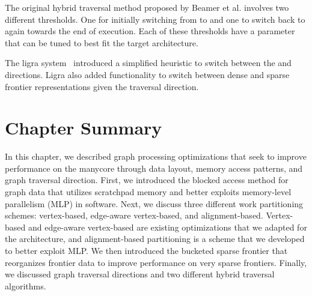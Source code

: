 The original hybrid traversal method proposed by Beamer et al. involves two different thresholds. One for initially switching from \push to \pull and one to switch back to \push again towards the end of execution.
Each of these thresholds have a parameter that can be tuned to best fit the target architecture. 

The ligra system~\cite{shun2013ligra} introduced a simplified heuristic to switch between the \push and \pull directions. 
Ligra also added functionality to switch between dense and sparse frontier representations given the traversal direction.


\section{Chapter Summary}

In this chapter, we described graph processing optimizations that seek to improve performance on the \hb manycore through data layout, memory access patterns, and graph traversal direction.
First, we introduced the blocked access method for graph data that utilizes scratchpad memory and better exploits memory-level parallelism (MLP) in software.
Next, we discuss three different work partitioning schemes: vertex-based, edge-aware vertex-based, and alignment-based.
Vertex-based and edge-aware vertex-based are existing optimizations that we adapted for the \hb architecture, and alignment-based partitioning is a scheme that we developed to better exploit MLP.
We then introduced the bucketed sparse frontier that reorganizes frontier data to improve performance on very sparse frontiers.
Finally, we discussed graph traversal directions and two different hybrid traversal algorithms.
